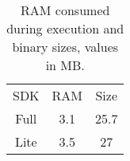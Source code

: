 \begin{table}[H]
    \centering
    \begin{tabular}{c|c|c}
        SDK &  RAM & Size\\
       Full  & 3.1  & 25.7\\
       Lite  & 3.5 & 27 \\
    \end{tabular}
    \caption{RAM consumed during execution and binary sizes, values in MB.}
    \label{tab:RAM}
\end{table}